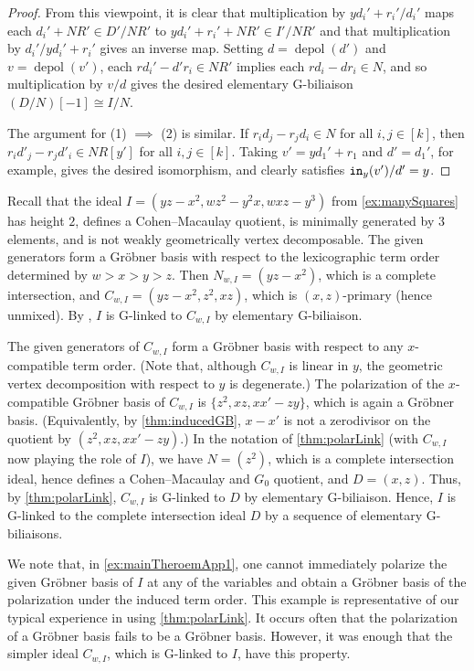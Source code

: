 \documentclass[12pt, reqno]{amsart}
\numberwithin{equation}{section}
\newtheorem{Main Conjecture}[theorem]{Main Conjecture}
\theoremstyle{definition}
\newenvironment{example}
  {\pushQED{\qed}\renewcommand{\qedsymbol}{$\diamondsuit$}\examplex}
  {\popQED\endexamplex}
\theoremstyle{plain}
\newcommand{\init}{{\tt in}}
\DeclareMathOperator{\depol}{depol}
\begin{document}
\begin{proof}
From this viewpoint, it is clear that multiplication by $yd_i'+r_i'/d_i'$ maps each $d_i'+NR' \in D'/NR'$ to $yd_i'+r_i'+NR' \in I'/NR'$ and that multiplication by $d_i'/yd_i'+r_i'$ gives an inverse map.  Setting $d =\depol(d')$ and $v =\depol(v')$, each $rd_i'-d'r_i \in NR'$ implies each $rd_i-dr_i \in N$, and so multiplication by $v/d$ gives the desired elementary G-biliaison $(D/N)[-1] \cong I/N$.

The argument for (1) $\implies$ (2) is similar. If $r_id_j-r_jd_i \in N$ for all $i,j \in [k]$, then $r_id'_j-r_jd'_i \in NR[y']$ for all $i,j \in [k]$. Taking $v' = yd_1'+r_1$ and $d' = d_1'$, for example, gives the desired isomorphism, and clearly satisfies $\init_y(v')/d' = y$.
\end{proof}


\begin{example}\label{ex:mainTheroemApp1}
   Recall that the ideal $I = (yz-x^2,wz^2-y^2x,wxz-y^3)$ from \cref{ex:manySquares} has height $2$, defines a Cohen--Macaulay quotient, is minimally generated by $3$ elements, and is not weakly geometrically vertex decomposable.  The given generators form a Gr\"obner basis with respect to the lexicographic term order determined by $w>x>y>z$.  Then $N_{w,I} = (yz-x^2)$, which is a complete intersection, and $C_{w,I} = (yz-x^2, z^2, xz)$, which is $(x,z)$-primary (hence unmixed).  By \cite[Corollary 4.3]{KR21}, $I$ is G-linked to $C_{w,I}$ by elementary G-biliaison.
    
    The given generators of $C_{w,I}$ form a Gr\"obner basis with respect to any $x$-compatible term order.  (Note that, although $C_{w,I}$ is linear in $y$, the geometric vertex decomposition with respect to $y$ is degenerate.)  The polarization of the $x$-compatible Gr\"obner basis of $C_{w,I}$ is $\{z^2, xz, xx'-zy\}$, which is again a Gr\"obner basis.  (Equivalently, by \cref{thm:inducedGB}, $x-x'$ is not a zerodivisor on the quotient by $(z^2, xz, xx'-zy)$.)  In the notation of \cref{thm:polarLink} (with $C_{w,I}$ now playing the role of $I$), we have $N = (z^2)$, which is a complete intersection ideal, hence defines a Cohen--Macaulay and $G_0$ quotient, and $D = (x,z)$.  Thus, by \cref{thm:polarLink}, $C_{w,I}$ is G-linked to $D$ by elementary G-biliaison.  Hence, $I$ is G-linked to the complete intersection ideal $D$ by a sequence of elementary G-biliaisons.
        \end{example}
    

    We note that, in \cref{ex:mainTheroemApp1}, one cannot immediately polarize the given Gr\"obner basis of $I$ at any of the variables and obtain a Gr\"obner basis of the polarization under the induced term order.  This example is representative of our typical experience in using \cref{thm:polarLink}.  It occurs often that the polarization of a Gr\"obner basis fails to be a Gr\"obner basis. However, it was enough that the simpler ideal $C_{w,I}$, which is G-linked to $I$, have this property.
\end{document}
